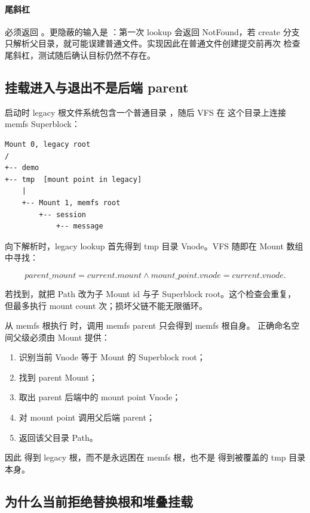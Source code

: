 \paragraph{尾斜杠}

 必须返回 。更隐蔽的输入是
：第一次 lookup 会返回 NotFound，若 create
分支只解析父目录，就可能误建普通文件。实现因此在普通文件创建提交前再次
检查尾斜杠，测试随后确认目标仍然不存在。

\subsection{挂载进入与退出不是后端 parent}

启动时 legacy 根文件系统包含一个普通目录 ，随后 VFS 在
这个目录上连接 memfs Superblock：

\begin{lstlisting}[caption={当前两层挂载树}]
Mount 0, legacy root
/
+-- demo
+-- tmp  [mount point in legacy]
    |
    +-- Mount 1, memfs root
        +-- session
            +-- message
\end{lstlisting}

向下解析时，legacy lookup 首先得到 tmp 目录 Vnode。VFS 随即在 Mount 数组
中寻找：

\[
  parent\_mount = current.mount
  \land mount\_point.vnode = current.vnode.
\]

若找到，就把 Path 改为子 Mount id 与子 Superblock root。这个检查会重复，
但最多执行 mount count 次；损坏父链不能无限循环。

从 memfs 根执行  时，调用 memfs parent 只会得到 memfs 根自身。
正确命名空间父级必须由 Mount 提供：

\begin{enumerate}
  \item 识别当前 Vnode 等于 Mount 的 Superblock root；
  \item 找到 parent Mount；
  \item 取出 parent 后端中的 mount point Vnode；
  \item 对 mount point 调用父后端 parent；
  \item 返回该父目录 Path。
\end{enumerate}

因此  得到 legacy 根，而不是永远困在 memfs 根，也不是
得到被覆盖的 tmp 目录本身。

\subsection{为什么当前拒绝替换根和堆叠挂载}

